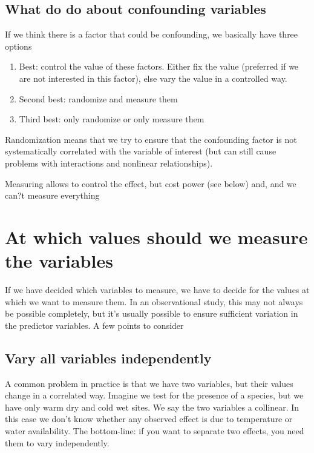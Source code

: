 \documentclass[a4paper,twoside]{tufte-book} %
\begin{document}
\subsection{What do do about confounding variables}

If we think there is a factor that could be confounding, we basically have three options

\begin{enumerate}
\item Best: control the value of these factors. Either fix the value (preferred if we are not interested in this factor), else vary the value in a controlled way.
\item Second best: randomize and measure them
\item Third best: only randomize or only measure them
\end{enumerate}

Randomization means that we try to ensure that the confounding factor is not systematically correlated with the variable of interest (but can still cause problems with interactions and nonlinear relationships).

Measuring allows to control the effect, but cost power (see below) and, and we can?t measure everything

\section{At which values should we measure the variables}

If we have decided which variables to measure, we have to decide for the values at which we want to measure them. In an observational study, this may not always be possible completely, but it's usually possible to ensure sufficient variation in the predictor variables. A few points to consider

\subsection{Vary all variables independently}

A common problem in practice is that we have two variables,  but their values change in a correlated way. Imagine we test for the presence of a species, but we have only warm dry and cold wet sites. We say the two variables a collinear. In this case we don't know whether any observed effect is due to temperature or water availability. The bottom-line: if you want to separate two effects, you need them to vary independently. 
\end{document}
